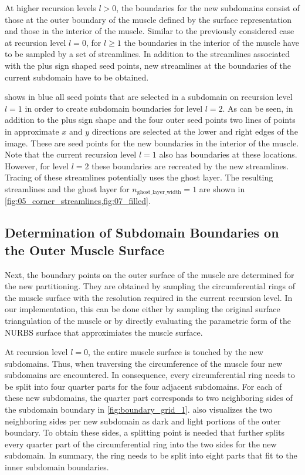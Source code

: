 At higher recursion levels $l>0$, the boundaries for the new subdomains consist of those at the outer boundary of the muscle defined by the surface representation and those in the interior of the muscle.
Similar to the previously considered case at recursion level $l=0$, for $l\geq 1$ the boundaries in the interior of the muscle have to be sampled by a set of streamlines. In addition to the streamlines associated with the plus sign shaped seed points, new streamlines at the boundaries of the current subdomain have to be obtained.

 shows in blue all seed points that are selected in a subdomain on recursion level $l=1$ in order to create subdomain boundaries for level $l=2$.
As can be seen, in addition to the plus sign shape and the four outer seed points two lines of points in approximate $x$ and $y$ directions are selected at the lower and right edges of the image.
These are seed points for the new boundaries in the interior of the muscle. Note that the current recursion level $l=1$ also has boundaries at these locations. However, for level $l=2$ these boundaries are recreated by the new streamlines. Tracing of these streamlines potentially uses the ghost layer. The resulting streamlines and the ghost layer for $n_\text{ghost\_layer\_width}=1$ are shown in \cref{fig:05_corner_streamlines,fig:07_filled}.

\subsection{Determination of Subdomain Boundaries on the Outer Muscle Surface}

Next, the boundary points on the outer surface of the muscle are determined for the new partitioning. They are obtained by sampling the circumferential rings of the muscle surface with the resolution required in the current recursion level. In our implementation, this can be done either by sampling the original surface triangulation of the muscle or by directly evaluating the parametric form of the NURBS surface that approximiates the muscle surface.

At recursion level $l=0$, the entire muscle surface is touched by the new subdomains. Thus, when traversing the circumference of the muscle four new subdomains are encountered.
In consequence, every circumferential ring needs to be split into four quarter parts for the four adjacent subdomains. For each of these new subdomains, the quarter part corresponds to two neighboring sides of the subdomain boundary in \cref{fig:boundary_grid_1}.  also visualizes the two neighboring sides per new subdomain as dark and light portions of the outer boundary. 
To obtain these sides, a splitting point is needed that further splits every quarter part of the circumferential ring into the two sides for the new subdomain.
In summary, the ring needs to be split into eight parts that fit to the inner subdomain boundaries.

